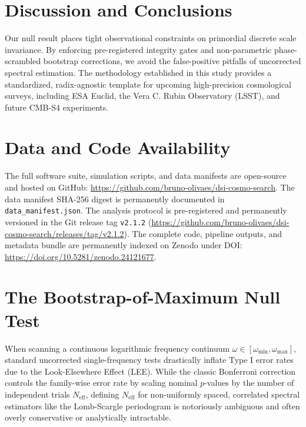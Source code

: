 \documentclass[10pt,twocolumn,a4paper]{article}
\begin{document}
\section{Discussion and Conclusions}
Our null result places tight observational constraints on primordial discrete scale invariance. By enforcing pre-registered integrity gates and non-parametric phase-scrambled bootstrap corrections, we avoid the false-positive pitfalls of uncorrected spectral estimation. The methodology established in this study provides a standardized, radix-agnostic template for upcoming high-precision cosmological surveys, including ESA Euclid, the Vera C. Rubin Observatory (LSST), and future CMB-S4 experiments.

\section*{Data and Code Availability}
The full software suite, simulation scripts, and data manifests are open-source and hosted on GitHub: \url{https://github.com/bruno-olivaes/dsi-cosmo-search}. The data manifest SHA-256 digest is permanently documented in \texttt{data\_manifest.json}. The analysis protocol is pre-registered and permanently versioned in the Git release tag \texttt{v2.1.2} (\url{https://github.com/bruno-olivaes/dsi-cosmo-search/releases/tag/v2.1.2}). The complete code, pipeline outputs, and metadata bundle are permanently indexed on Zenodo under DOI: \url{https://doi.org/10.5281/zenodo.24121677}.

\appendix

\section{The Bootstrap-of-Maximum Null Test}
When scanning a continuous logarithmic frequency continuum $\omega \in [\omega_{\min}, \omega_{\max}]$, standard uncorrected single-frequency tests drastically inflate Type I error rates due to the Look-Elsewhere Effect (LEE). While the classic Bonferroni correction controls the family-wise error rate by scaling nominal $p$-values by the number of independent trials $N_{\mathrm{eff}}$, defining $N_{\mathrm{eff}}$ for non-uniformly spaced, correlated spectral estimators like the Lomb-Scargle periodogram is notoriously ambiguous and often overly conservative or analytically intractable.
\end{document}

